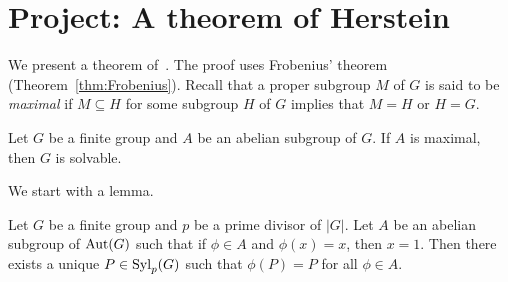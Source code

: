 \section{Project: A theorem of Herstein}

We present 
a theorem of~\cite{MR93542}. The proof uses Frobenius' theorem (Theorem~\ref{thm:Frobenius}). Recall that 
a proper subgroup $M$ of $G$ is said to be \emph{maximal} 
if $M\subseteq H$ for some subgroup $H$ of $G$ 
implies that $M=H$ or $H=G$. 

\begin{theorem}[Herstein]
\label{thm:Herstein}
    Let $G$ be a finite group and $A$ be an abelian
    subgroup of $G$. If $A$ is maximal, then
    $G$ is solvable. 
\end{theorem}

We start with a lemma.

\begin{lemma}
    Let $G$ be a finite group and $p$ be a prime divisor of $|G|$. Let $A$ be an abelian
    subgroup of $\operatorname{Aut}(G)$ such that if $\phi\in A$ and 
    $\phi(x)=x$, then $x=1$. Then there 
    exists a unique $P\in\mathrm{Syl}_p(G)$
    such that $\phi(P)=P$ for all $\phi\in A$. 
\end{lemma}

